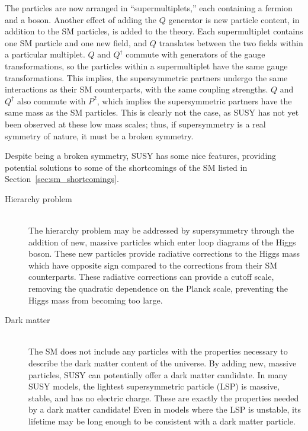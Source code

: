 The particles are now arranged in ``supermultiplets,'' each containing a
fermion and a boson.
Another effect of adding the $Q$ generator is new particle content, in addition
to the SM particles, is added to the theory.
Each supermultiplet contains one SM particle and one new field, and $Q$
translates between the two fields within a particular multiplet.
$Q$ and $Q^{\dagger}$ commute with generators of the gauge transformations,
so the particles within a supermultiplet have the same gauge transformations.
This implies, the supersymmetric partners undergo the same interactions as
their SM counterparts, with the same coupling strengths.
$Q$ and $Q^{\dagger}$ also commute with $P^2$, which implies the supersymmetric
partners have the same mass as the SM particles.
This is clearly not the case, as SUSY has not yet been observed at these low
mass scales; thus, if supersymmetry is a real symmetry of nature, it must be
a broken symmetry.

Despite being a broken symmetry, SUSY has some nice features, providing
potential solutions to some of the shortcomings of the SM listed in
Section~\ref{sec:sm_shortcomings}.
\begin{description}
  \item[Hierarchy problem] \hfill \\
    The hierarchy problem may be addressed by
    supersymmetry through the addition of new, massive particles which enter
    loop diagrams of the Higgs boson.
    These new particles provide radiative corrections to the Higgs mass which
    have opposite sign compared to the corrections from their SM counterparts.
    These radiative corrections can provide a cutoff scale, removing the
    quadratic dependence on the Planck scale, preventing the Higgs mass from
    becoming too large.
  \item[Dark matter] \hfill \\
    The SM does not include any particles with the
    properties necessary to describe the dark matter content of the universe.
    By adding new, massive particles, SUSY can potentially offer a dark matter
    candidate.
    In many SUSY models, the lightest supersymmetric particle (LSP) is massive,
    stable, and has no electric charge.
    These are exactly the properties needed by a dark matter candidate!
    Even in models where the LSP is unstable, its lifetime may be long enough
    to be consistent with a dark matter particle.
\end{description}

\FloatBarrier
